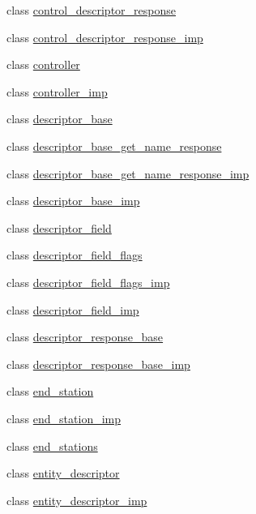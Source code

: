 \begin{DoxyCompactItemize}
class \hyperlink{classavdecc__lib_1_1control__descriptor__response}{control\+\_\+descriptor\+\_\+response}
\item 
class \hyperlink{classavdecc__lib_1_1control__descriptor__response__imp}{control\+\_\+descriptor\+\_\+response\+\_\+imp}
\item 
class \hyperlink{classavdecc__lib_1_1controller}{controller}
\item 
class \hyperlink{classavdecc__lib_1_1controller__imp}{controller\+\_\+imp}
\item 
class \hyperlink{classavdecc__lib_1_1descriptor__base}{descriptor\+\_\+base}
\item 
class \hyperlink{classavdecc__lib_1_1descriptor__base__get__name__response}{descriptor\+\_\+base\+\_\+get\+\_\+name\+\_\+response}
\item 
class \hyperlink{classavdecc__lib_1_1descriptor__base__get__name__response__imp}{descriptor\+\_\+base\+\_\+get\+\_\+name\+\_\+response\+\_\+imp}
\item 
class \hyperlink{classavdecc__lib_1_1descriptor__base__imp}{descriptor\+\_\+base\+\_\+imp}
\item 
class \hyperlink{classavdecc__lib_1_1descriptor__field}{descriptor\+\_\+field}
\item 
class \hyperlink{classavdecc__lib_1_1descriptor__field__flags}{descriptor\+\_\+field\+\_\+flags}
\item 
class \hyperlink{classavdecc__lib_1_1descriptor__field__flags__imp}{descriptor\+\_\+field\+\_\+flags\+\_\+imp}
\item 
class \hyperlink{classavdecc__lib_1_1descriptor__field__imp}{descriptor\+\_\+field\+\_\+imp}
\item 
class \hyperlink{classavdecc__lib_1_1descriptor__response__base}{descriptor\+\_\+response\+\_\+base}
\item 
class \hyperlink{classavdecc__lib_1_1descriptor__response__base__imp}{descriptor\+\_\+response\+\_\+base\+\_\+imp}
\item 
class \hyperlink{classavdecc__lib_1_1end__station}{end\+\_\+station}
\item 
class \hyperlink{classavdecc__lib_1_1end__station__imp}{end\+\_\+station\+\_\+imp}
\item 
class \hyperlink{classavdecc__lib_1_1end__stations}{end\+\_\+stations}
\item 
class \hyperlink{classavdecc__lib_1_1entity__descriptor}{entity\+\_\+descriptor}
\item 
class \hyperlink{classavdecc__lib_1_1entity__descriptor__imp}{entity\+\_\+descriptor\+\_\+imp}

\end{DoxyCompactItemize}
